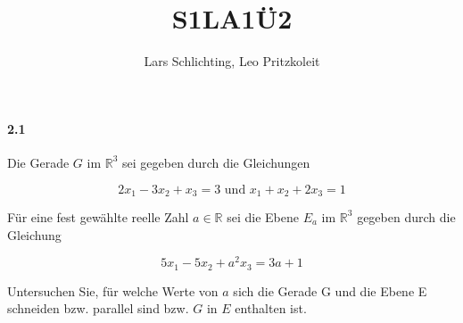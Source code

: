 \documentclass[12pt, letterpaper]{article}
\title{S1LA1Ü2}
\author{Lars Schlichting, Leo Pritzkoleit}
\date{}
\begin{document}
\maketitle

\paragraph{2.1}

Die Gerade $G$ im $\mathbb{R}^{3}$ sei gegeben durch die Gleichungen

$$2x_1-3x_2+x_3=3 \text{ und } x_1+x_2+2x_3=1$$

\noindent Für eine fest gewählte reelle Zahl $a \in \mathbb{R}$ sei die Ebene $E_a$ im $\mathbb{R}^{3}$ gegeben durch die Gleichung

$$5x_1-5x_2+a^{2}x_3=3a+1$$

\noindent Untersuchen Sie, für welche Werte von $a$ sich die Gerade G und die Ebene E schneiden bzw. parallel sind bzw. $G$ in $E$ enthalten ist.\\
\end{document}
